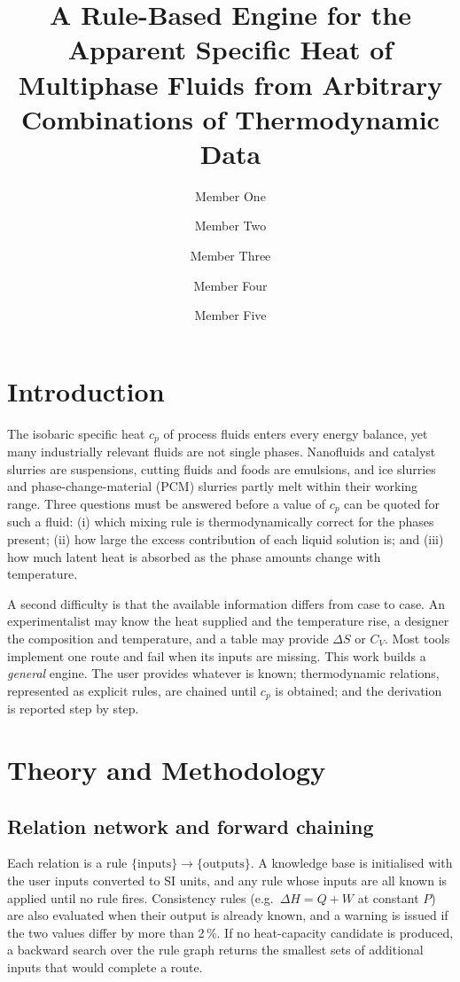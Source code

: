 \documentclass[journal=jceaax,manuscript=article,layout=twocolumn]{achemso}
\author{Member One}       %
\author{Member Two}
\author{Member Three}
\author{Member Four}
\author{Member Five}
\affiliation{Department of Chemical Engineering, Indian Institute of Technology Gandhinagar, Palaj, Gandhinagar 382355, Gujarat, India}
\title{A Rule-Based Engine for the Apparent Specific Heat of Multiphase Fluids from Arbitrary Combinations of Thermodynamic Data}
\begin{document}
\section{Introduction}
The isobaric specific heat $c_p$ of process fluids enters every energy balance, yet many industrially
relevant fluids are not single phases. Nanofluids and catalyst slurries are suspensions, cutting fluids
and foods are emulsions, and ice slurries and phase-change-material (PCM) slurries partly melt within
their working range. Three questions must be answered before a value of $c_p$ can be quoted for such a
fluid: (i) which mixing rule is thermodynamically correct for the phases present; (ii) how large the
excess contribution of each liquid solution is; and (iii) how much latent heat is absorbed as the phase
amounts change with temperature.

A second difficulty is that the available information differs from case to case. An experimentalist
may know the heat supplied and the temperature rise, a designer the composition and temperature, and a
table may provide $\Delta S$ or $C_V$. Most tools implement one route and fail when its inputs are missing.
This work builds a \emph{general} engine. The user provides whatever is known; thermodynamic relations,
represented as explicit rules, are chained until $c_p$ is obtained; and the derivation is reported step
by step.

\section{Theory and Methodology}
\subsection{Relation network and forward chaining}
Each relation is a rule $\{\text{inputs}\}\rightarrow\{\text{outputs}\}$. A knowledge base is
initialised with the user inputs converted to SI units, and any rule whose inputs are all known is
applied until no rule fires. Consistency rules (e.g.\ $\Delta H = Q + W$ at constant $P$) are also
evaluated when their output is already known, and a warning is issued if the two values differ by more
than 2\,\%. If no heat-capacity candidate is produced, a backward search over the rule graph returns
the smallest sets of additional inputs that would complete a route.
\end{document}
